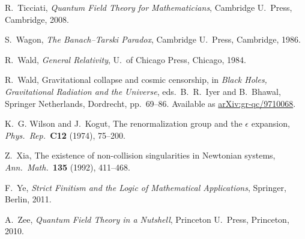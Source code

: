 \documentclass{article}
\begin{document}
\begin{thebibliography}{10}
 R.\ Ticciati, \textsl{Quantum Field Theory for Mathematicians},
Cambridge U.\ Press, Cambridge, 2008.

 S.\ Wagon, {\sl The Banach--Tarski Paradox}, Cambridge
U.\ Press, Cambridge, 1986.

 R.\ Wald, \textsl{General Relativity}, U.\ of Chicago Press, Chicago, 
1984.

 R.\ Wald, Gravitational collapse and cosmic censorship, in \textsl{Black Holes, Gravitational Radiation and the Universe}, eds.\ 
B.\ R.\ Iyer and B.\ Bhawal, Springer Netherlands, Dordrecht, pp.\ 69--86.
Available as \href{http://arxiv.org/abs/gr-qc/9710068}{arXiv:gr-qc/9710068}.

 K.\ G. Wilson and J.\ Kogut, The renormalization group and the $\epsilon$ expansion, \textsl{Phys.\ Rep.\ }\textbf{C12} (1974), 75--200. 

 Z.\ Xia, The existence of non-collision singularities in Newtonian systems, \textsl{Ann.\ Math.\ }{\bf 135} (1992), 411--468. 

  F.\ Ye, \textsl{Strict Finitism and the Logic of Mathematical Applications}, Springer,
Berlin, 2011.

 A.\ Zee, \textsl{Quantum Field Theory in a Nutshell}, Princeton U.\ 
Press, Princeton, 2010.

\end{thebibliography}
\end{document}
